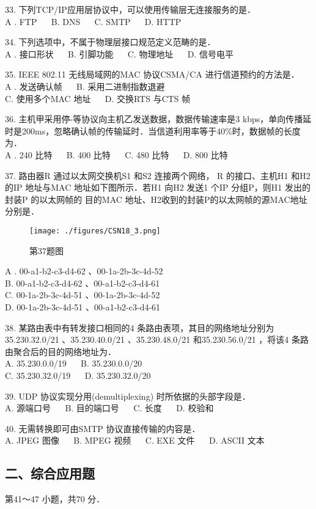 33. 下列TCP/IP应用层协议中，可以使用传输层无连接服务的是． \\
A . FTP $\quad$ B. DNS $\quad$ C. SMTP $\quad$ D. HTTP

34. 下列选项中，不属于物理层接口规范定义范畴的是． \\
A . 接口形状 $\quad$ B. 引脚功能 $\quad$ C. 物理地址 $\quad$ D. 信号电平

35. IEEE 802.11 无线局域网的MAC 协议CSMA/CA 进行信道预约的方法是． \\
A . 发送确认帧 $\quad$ B. 采用二进制指数退避 \\
C. 使用多个MAC 地址 $\quad$ D. 交换RTS 与CTS 帧

36. 主机甲采用停-等协议向主机乙发送数据，数据传输速率是3 kbps，单向传播延时是200ms，忽略确认帧的传输延时．当信道利用率等于40\%时，数据帧的长度为． \\
A . 240 比特 $\quad$ B. 400 比特 $\quad$ C. 480 比特 $\quad$ D. 800 比特

37. 路由器R 通过以太网交换机S1 和S2 连接两个网络， R 的接口、主机H1 和H2 的IP 地址与MAC 地址如下图所示．若H1 向H2 发送1 个IP 分组P，则H1 发出的封装P 的以太网帧的 目的MAC 地址、H2收到的封装P的以太网帧的源MAC地址分别是．
\begin{figure}[ht]
\centering
\texttt{[image: ./figures/CSN18\_3.png]}
\caption{第37题图} \label{CSN18_fig3}
\end{figure}
A . 00-a1-b2-c3-d4-62 、00-1a-2b-3c-4d-52 \\
B. 00-a1-b2-c3-d4-62 、00-a1-b2-c3-d4-61 \\
C. 00-1a-2b-3c-4d-51 、00-1a-2b-3c-4d-52 \\
D. 00-1a-2b-3c-4d-51 、00-a1-b2-c3-d4-61

38. 某路由表中有转发接口相同的4 条路由表项，其目的网络地址分别为35.230.32.0/21 、35.230.40.0/21 、35.230.48.0/21 和35.230.56.0/21 ，将该4 条路由聚合后的目的网络地址为． \\
A. 35.230.0.0/19 $\quad$ B. 35.230.0.0/20 \\
C. 35.230.32.0/19 $\quad$ D. 35.230.32.0/20

39. UDP 协议实现分用(demultiplexing) 时所依据的头部字段是． \\
A. 源端口号 $\quad$ B. 目的端口号 $\quad$ C. 长度 $\quad$ D. 校验和

40. 无需转换即可由SMTP 协议直接传输的内容是． \\
A. JPEG 图像  $\quad$ B. MPEG 视频 $\quad$ C. EXE 文件 $\quad$ D. ASCII 文本

\subsection{二、综合应用题}
第41～47 小题，共70 分．

